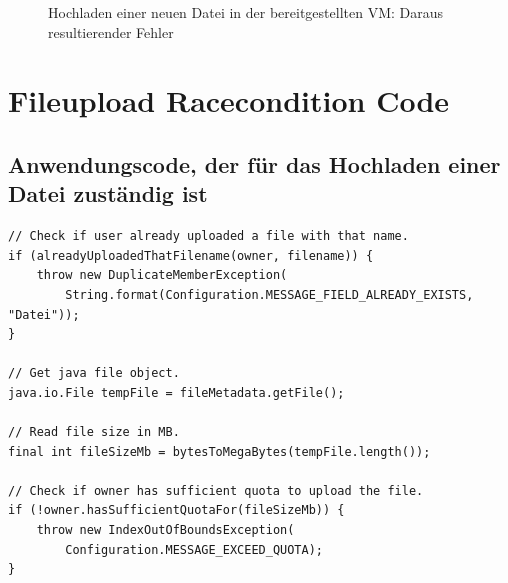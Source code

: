 \documentclass[12pt,DIV14,BCOR10mm,a4paper,parskip=half-,headsepline,headinclude,english,ngerman,bibliography=totocnumbered]{scrreprt}
\begin{document}
\begin{appendices}
\begin{figure}[!htb]
  \centering
    \label{upload_fail_1}
    \caption{Hochladen einer neuen Datei in der bereitgestellten VM: Daraus resultierender Fehler}
  \end{figure}

\chapter{Fileupload Racecondition Code}

\section{Anwendungscode, der für das Hochladen einer Datei zuständig ist}
\label{fileuploadcode}
\begin{lstlisting}
// Check if user already uploaded a file with that name.
if (alreadyUploadedThatFilename(owner, filename)) {
    throw new DuplicateMemberException(
        String.format(Configuration.MESSAGE_FIELD_ALREADY_EXISTS, "Datei"));
}

// Get java file object.
java.io.File tempFile = fileMetadata.getFile();

// Read file size in MB.
final int fileSizeMb = bytesToMegaBytes(tempFile.length());

// Check if owner has sufficient quota to upload the file.
if (!owner.hasSufficientQuotaFor(fileSizeMb)) {
    throw new IndexOutOfBoundsException(
        Configuration.MESSAGE_EXCEED_QUOTA);
}


\end{lstlisting}
\end{appendices}
\end{document}
